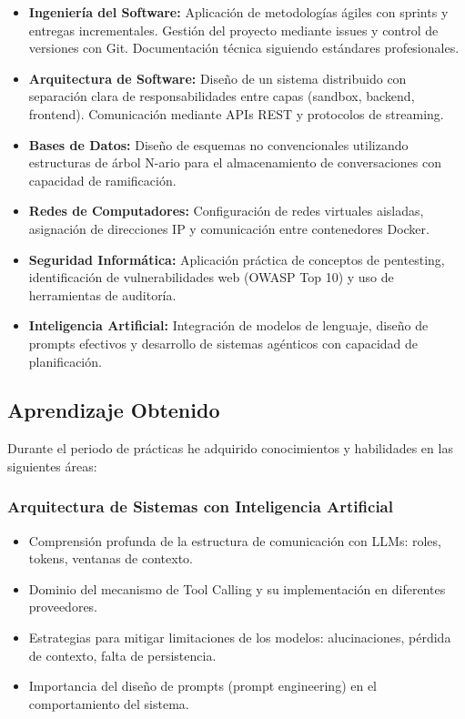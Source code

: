 \documentclass[12pt,a4paper]{article}
\begin{document}
\begin{itemize}
    \item \textbf{Ingeniería del Software:} Aplicación de metodologías ágiles con sprints y entregas incrementales. Gestión del proyecto mediante issues y control de versiones con Git. Documentación técnica siguiendo estándares profesionales.
    
    \item \textbf{Arquitectura de Software:} Diseño de un sistema distribuido con separación clara de responsabilidades entre capas (sandbox, backend, frontend). Comunicación mediante APIs REST y protocolos de streaming.
    
    \item \textbf{Bases de Datos:} Diseño de esquemas no convencionales utilizando estructuras de árbol N-ario para el almacenamiento de conversaciones con capacidad de ramificación.
    
    \item \textbf{Redes de Computadores:} Configuración de redes virtuales aisladas, asignación de direcciones IP y comunicación entre contenedores Docker.
    
    \item \textbf{Seguridad Informática:} Aplicación práctica de conceptos de pentesting, identificación de vulnerabilidades web (OWASP Top 10) y uso de herramientas de auditoría.
    
    \item \textbf{Inteligencia Artificial:} Integración de modelos de lenguaje, diseño de prompts efectivos y desarrollo de sistemas agénticos con capacidad de planificación.
\end{itemize}

\subsection{Aprendizaje Obtenido}

Durante el periodo de prácticas he adquirido conocimientos y habilidades en las siguientes áreas:

\subsubsection{Arquitectura de Sistemas con Inteligencia Artificial}

\begin{itemize}
    \item Comprensión profunda de la estructura de comunicación con LLMs: roles, tokens, ventanas de contexto.
    \item Dominio del mecanismo de Tool Calling y su implementación en diferentes proveedores.
    \item Estrategias para mitigar limitaciones de los modelos: alucinaciones, pérdida de contexto, falta de persistencia.
    \item Importancia del diseño de prompts (prompt engineering) en el comportamiento del sistema.
\end{itemize}
\end{document}
